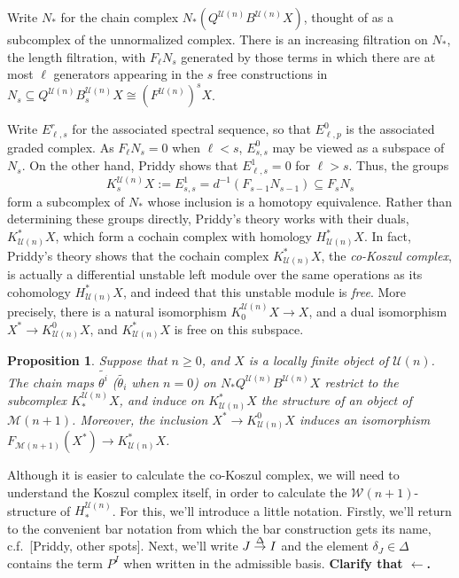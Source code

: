 \documentclass[11pt]{amsart}
\theoremstyle{plain}
\newtheorem{prop}[thm]{Proposition}
\theoremstyle{definition}
\renewcommand{\to}{\longrightarrow}
\newcommand{\calW}{\mathcal{W}}
\newcommand{\calU}{\mathcal{U}}
\newcommand{\calM}{\mathcal{M}}
\theoremstyle{plain}
\newcommand{\deltaalg}{\Delta} %
\newcommand{\produces}[3]{#3:#1\sim #2}
\renewcommand{\produces}[3]{#1\rightarrow_{#3} #2}%
\renewcommand{\produces}[3]{#1\overset{\smash{#3}}{\rightarrow} #2}%
\begin{document}
\begin{Koszul complexes}
Write $N_*$ for the chain complex $N_*(Q^{\calU(n)}B^{\calU(n)}X)$, thought of as a subcomplex of the unnormalized complex. There is an increasing filtration on $N_*$, the length filtration, with $F_\ell N_s$ generated by those terms in which there are at most $\ell$ generators appearing in the $s$ free constructions in $N_s\subseteq Q^{\calU(n)}B^{\calU(n)}_sX\cong (F^{\calU(n)})^sX$.

Write $E^r_{\ell,s}$ for the associated spectral sequence, so that $E^0_{\ell,p}$ is the associated graded complex. As $F_\ell N_s=0$ when $\ell<s$, $E^0_{s,s}$ may be viewed as a subspace of $N_s$. On the other hand, Priddy shows that $E^1_{\ell,s}=0$  for $\ell>s$. Thus, the groups
\[K_s^{\calU(n)}X:=E^1_{s,s}=d^{-1}(F_{s-1}N_{s-1})\subseteq F_sN_s\]
form a subcomplex of $N_*$ whose inclusion is a homotopy equivalence. Rather than determining these groups directly, Priddy's theory works with their duals, $K^*_{\calU(n)}X$, which form a cochain complex with homology $H^*_{\calU(n)}X$. In fact, Priddy's theory shows that the cochain complex $K^*_{\calU(n)}X$, the \emph{co-Koszul complex}, is actually a differential unstable left module over the same operations as its cohomology $H^*_{\calU(n)}X$, and indeed that this unstable module is \emph{free}. More precisely, there is a natural isomorphism $K_0^{\calU(n)}X\to X$, and a dual isomorphism $X^*\to K^0_{\calU(n)}X$, and $K^*_{\calU(n)}X$ is free on this subspace.
\begin{prop}\label{the cokoszul complex is free}
Suppose that $n\geq0$, and $X$ is a locally finite object of $\calU(n)$. The chain maps $\widetilde{\theta^i}$ ($\widetilde{\theta_i}$ when $n=0$) on $N_*Q^{\calU(n)}B^{\calU(n)}X$ restrict to the subcomplex $K_*^{\calU(n)}X$, and induce on $K^*_{\calU(n)}X$ the structure of an object of $\calM(n+1)$. Moreover, the inclusion $X^*\to K^0_{\calU(n)}X$ induces an isomorphism $F_{\calM(n+1)}(X^*)\to K^*_{\calU(n)}X$.
\end{prop}


Although it is easier to calculate the co-Koszul complex, we will need to understand the Koszul complex itself, in order to calculate the $\calW(n+1)$-structure of $H_*^{\calU(n)}$. For this, we'll introduce a little notation. Firstly, we'll return to the convenient bar notation from which the bar construction gets its name, c.f.\ [Priddy, other spots]. Next, we'll write $\produces{J}{I}{\deltaalg}$  and the element $\delta_J\in\deltaalg$ contains the term $P^I$ when written in the admissible basis. \textbf{Clarify that $\leftarrow$.}


\end{Koszul complexes}
\end{document}
